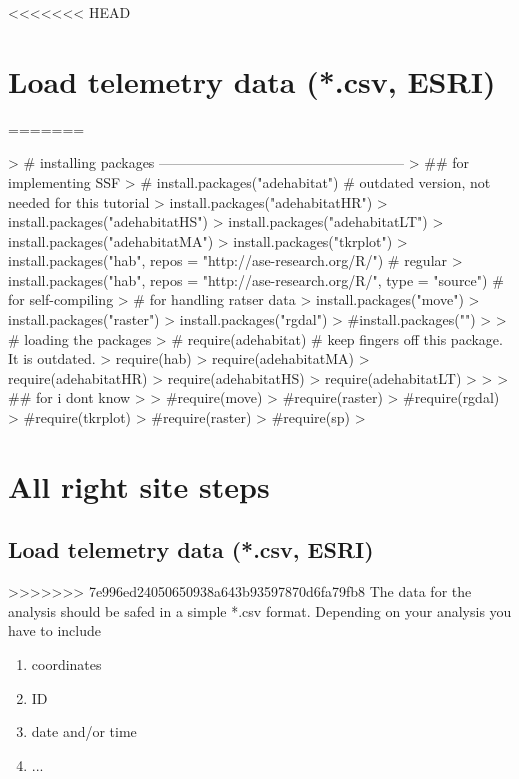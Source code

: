 \documentclass[11pt, a4paper]{article} %
\begin{document}
<<<<<<< HEAD
\section{Load telemetry data (*.csv, ESRI)}%
=======
\begin{Schunk}
\begin{Sinput}
> # installing packages -----------------------------------------------------
> ## for implementing SSF
> # install.packages("adehabitat") # outdated version, not needed for this tutorial
> install.packages("adehabitatHR")
> install.packages("adehabitatHS")
> install.packages("adehabitatLT")
> install.packages("adehabitatMA")
> install.packages("tkrplot")
> install.packages("hab", repos = "http://ase-research.org/R/") # regular
> install.packages("hab", repos = "http://ase-research.org/R/", type = "source") # for self-compiling
> # for handling ratser data
> install.packages("move")
> install.packages("raster")
> install.packages("rgdal")
> #install.packages("")
> 
> # loading the packages
> # require(adehabitat) # keep fingers off this package. It is outdated.
> require(hab)
> require(adehabitatMA)
> require(adehabitatHR)
> require(adehabitatHS)
> require(adehabitatLT)
> 
> 
> ## for i dont know
> 
> #require(move)
> #require(raster)
> #require(rgdal)
> #require(tkrplot)
> #require(raster)
> #require(sp)
> 
\end{Sinput}
\end{Schunk}

\section{All right site steps}

\subsection{Load telemetry data (*.csv, ESRI)}%
>>>>>>> 7e996ed24050650938a643b93597870d6fa79fb8
The data for the analysis should be safed in a simple *.csv format. Depending on your analysis you have to include 
\begin{enumerate}
\item{coordinates}
\item{ID}
\item{date and/or time}
\item{...}
\end{enumerate}
\end{document}
